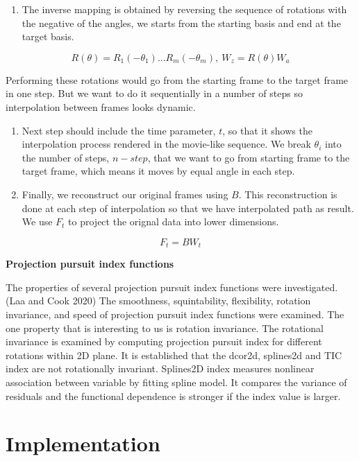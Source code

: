 \begin{enumerate}
\def\labelenumi{\arabic{enumi}.}
\setcounter{enumi}{3}
\tightlist
\item
  The inverse mapping is obtained by reversing the sequence of rotations with the negative of the angles, we starts from the starting basis and end at the target basis.
\end{enumerate}

\[R(\theta) = R_1(-\theta_1) ... R_m(-\theta_m), \    W_z = R(\theta)W_a\]

Performing these rotations would go from the starting frame to the target frame in one step. But we want to do it sequentially in a number of steps so interpolation between frames looks dynamic.

\begin{enumerate}
\def\labelenumi{\arabic{enumi}.}
\setcounter{enumi}{4}
\item
  Next step should include the time parameter, \(t\), so that it shows the interpolation process rendered in the movie-like sequence. We break \(\theta_i\) into the number of steps, \(n-step\), that we want to go from starting frame to the target frame, which means it moves by equal angle in each step.
\item
  Finally, we reconstruct our original frames using \(B\). This reconstruction is done at each step of interpolation so that we have interpolated path as result. We use \(F_t\) to project the orignal data into lower dimensions.
\end{enumerate}

\[F_t = B  W_t\]

\textbf{Projection pursuit index functions}

The properties of several projection pursuit index functions were investigated.(Laa and Cook 2020) The smoothness, squintability, flexibility, rotation invariance, and speed of projection pursuit index functions were examined. The one property that is interesting to us is rotation invariance. The rotational invariance is examined by computing projection pursuit index for different rotations within 2D plane. It is established that the dcor2d, splines2d and TIC index are not rotationally invariant. Splines2D index measures nonlinear association between variable by fitting spline model. It compares the variance of residuals and the functional dependence is stronger if the index value is larger.

\hypertarget{implementation}{%
\section{Implementation}\label{implementation}}

